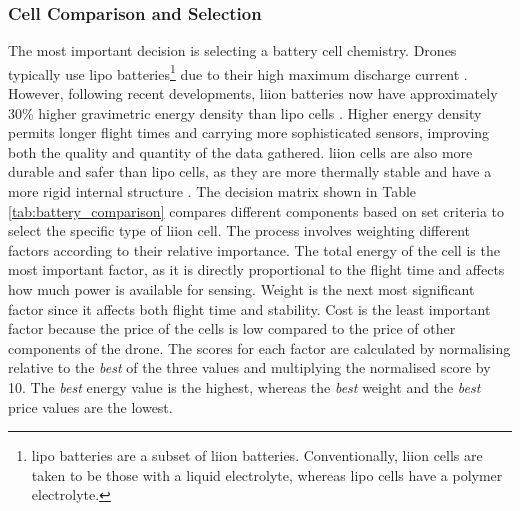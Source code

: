 \subsubsection{Cell Comparison and Selection}

The most important decision is selecting a battery cell chemistry. Drones typically use \gls{lipo} batteries\footnote{\acrshort{lipo} batteries are a subset of \acrshort{liion} batteries. Conventionally, \acrshort{liion} cells are taken to be those with a liquid electrolyte, whereas \acrshort{lipo} cells have a polymer electrolyte.} due to their high maximum discharge current \cite{10808488}. However, following recent developments, \gls{liion} batteries now have approximately 30\% higher gravimetric energy density than \acrshort{lipo} cells  \cite{Agrawal_2008}. Higher energy density permits longer flight times and carrying more sophisticated sensors, improving both the quality and quantity of the data gathered. \acrshort{liion} cells are also more durable and safer than \acrshort{lipo} cells, as they are more thermally stable and have a more rigid internal structure \cite{bergveld2014battery}. The decision matrix shown in Table \ref{tab:battery_comparison} compares different components based on set criteria to select the specific type of \acrshort{liion} cell. The process involves weighting different factors according to their relative importance. The total energy of the cell is the most important factor, as it is directly proportional to the flight time and affects how much power is available for sensing. Weight is the next most significant factor since it affects both flight time and stability. Cost is the least important factor because the price of the cells is low compared to the price of other components of the drone. The scores for each factor are calculated by normalising relative to the \textit{best} of the three values and multiplying the normalised score by 10. The \textit{best} energy value is the highest, whereas the \textit{best} weight and the \textit{best} price values are the lowest. 

